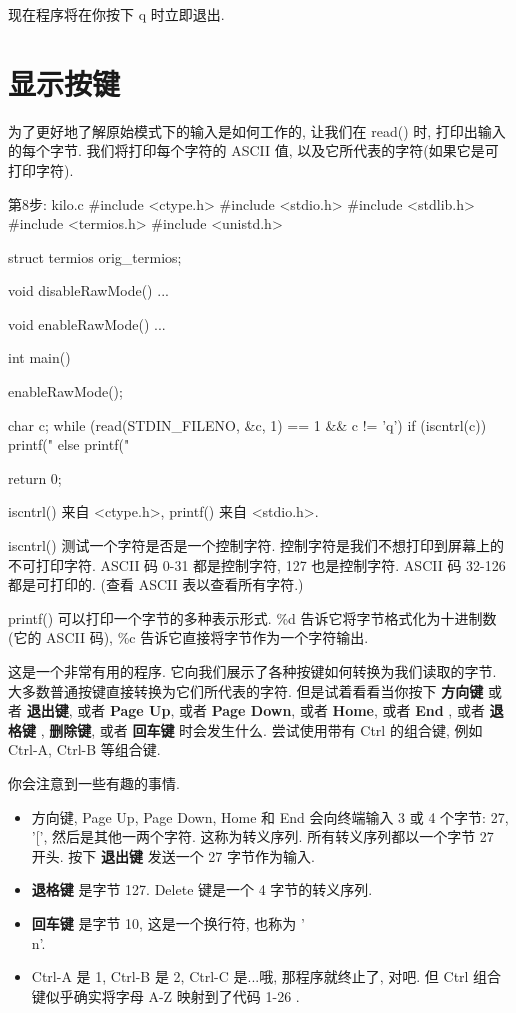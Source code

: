 \documentclass[lang=cn,newtx,10pt,scheme=chinese]{elegantbook}
\begin{document}
现在程序将在你按下 q 时立即退出.

\section{显示按键}

为了更好地了解原始模式下的输入是如何工作的, 让我们在 read() 时, 打印出输入的每个字节. 我们将打印每个字符的 ASCII 值, 以及它所代表的字符(如果它是可打印字符).

\begin{mycode}{第8步: kilo.c}
#include <ctype.h>
#include <stdio.h>
#include <stdlib.h>
#include <termios.h>
#include <unistd.h>

struct termios orig_termios;

void disableRawMode() { ... }

void enableRawMode() { ... }

int main() {
  enableRawMode();

  char c;
  while (read(STDIN_FILENO, &c, 1) == 1 && c != 'q') {
    if (iscntrl(c)) {
      printf("%
    } else {
      printf("%
    }
  }

  return 0;
}
\end{mycode}

iscntrl() 来自 <ctype.h>, printf() 来自 <stdio.h>.

iscntrl() 测试一个字符是否是一个控制字符. 控制字符是我们不想打印到屏幕上的不可打印字符. ASCII 码 0-31 都是控制字符, 127 也是控制字符. ASCII 码 32-126 都是可打印的. (查看 ASCII 表以查看所有字符.)

printf() 可以打印一个字节的多种表示形式. \%d 告诉它将字节格式化为十进制数(它的 ASCII 码), \%c 告诉它直接将字节作为一个字符输出.

这是一个非常有用的程序. 它向我们展示了各种按键如何转换为我们读取的字节. 大多数普通按键直接转换为它们所代表的字符. 但是试着看看当你按下 \textbf{方向键} 或者 \textbf{退出键}, 或者 \textbf{Page Up}, 或者 \textbf{Page Down}, 或者 \textbf{Home}, 或者 \textbf{End} , 或者 \textbf{退格键} , \textbf{删除键}, 或者 \textbf{回车键} 时会发生什么. 尝试使用带有 Ctrl 的组合键, 例如 Ctrl-A, Ctrl-B 等组合键.

你会注意到一些有趣的事情.

\begin{itemize}
\item 方向键, Page Up, Page Down, Home 和 End 会向终端输入 3 或 4 个字节: 27, '[', 然后是其他一两个字符. 这称为转义序列. 所有转义序列都以一个字节 27 开头. 按下 \textbf{退出键} 发送一个 27 字节作为输入.
\item \textbf{退格键} 是字节 127. Delete 键是一个 4 字节的转义序列.
\item \textbf{回车键} 是字节 10, 这是一个换行符, 也称为 '\\n'.
\item Ctrl-A 是 1, Ctrl-B 是 2, Ctrl-C 是...哦, 那程序就终止了, 对吧. 但 Ctrl 组合键似乎确实将字母 A-Z 映射到了代码 1-26 .
\end{itemize}
\end{document}
